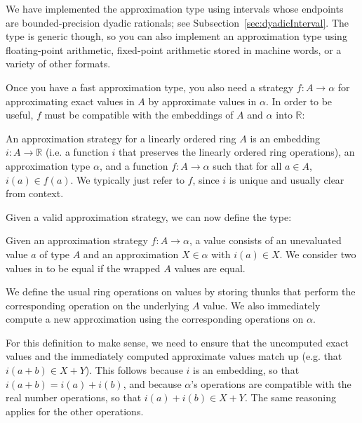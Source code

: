 We have implemented the approximation type using intervals whose endpoints are
bounded-precision dyadic rationals; see Subsection~\ref{sec:dyadicInterval}. The
 type is generic though, so you can also implement an
approximation type using floating-point arithmetic, fixed-point arithmetic
stored in machine words, or a variety of other formats.

Once you have a fast approximation type, you also need a strategy $f : A → α$
for approximating exact values in $A$ by approximate values in $α$. In order to
be useful, $f$ must be compatible with the embeddings of $A$ and $α$ into $ℝ$:

\begin{definition}
  \label{def:approxStrategy}
  \leanok
  An approximation strategy for a linearly ordered ring $A$ is an embedding $i :
  A → ℝ$ (i.e. a function $i$ that preserves the linearly ordered ring
  operations), an approximation type $α$, and a function $f : A → α$ such that
  for all $a ∈ A$, $i(a) ∈ f(a)$. We typically just refer to $f$, since $i$ is
  unique and usually clear from context.
\end{definition}

Given a valid approximation strategy, we can now define the 
type:

\begin{definition}
  \label{def:filtered}
  \leanok
  Given an approximation strategy $f : A → α$, a 
  value consists of an unevaluated value $a$ of type $A$ and an approximation $X
  ∈ α$ with $i(a) ∈ X$. We consider two values in  to be
  equal if the wrapped $A$ values are equal.
\end{definition}

\begin{definition}
  \label{def:filteredRingOps}
  \leanok
  We define the usual ring operations on  values by storing
  thunks that perform the corresponding operation on the underlying $A$ value.
  We also immediately compute a new approximation using the corresponding operations
  on $α$.

  For this definition to make sense, we need to ensure that the uncomputed
  exact values and the immediately computed approximate values match up (e.g.
  that $i(a + b) ∈ X + Y$). This follows because $i$ is an
  embedding, so that $i(a + b) = i(a) + i(b)$, and because $α$'s
  operations are compatible with the real number operations, so that $i(a) +
  i(b) ∈ X + Y$. The same reasoning applies for the other operations.
\end{definition}


